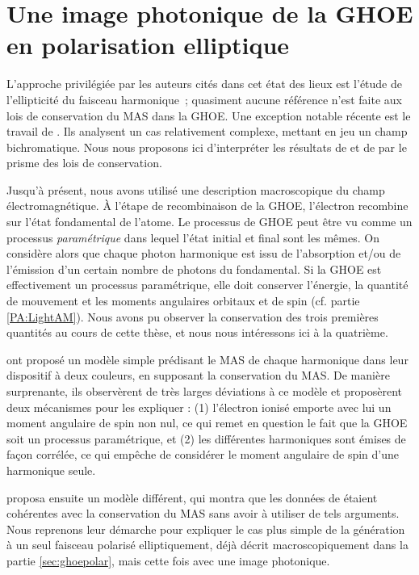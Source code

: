 \section{Une image photonique de la GHOE en polarisation elliptique}
L'approche privilégiée par les auteurs cités dans cet état des lieux est l'étude de l'ellipticité du faisceau harmonique~; quasiment aucune référence n'est faite aux lois de conservation du MAS dans la GHOE. Une exception notable récente est le travail de . Ils analysent un cas relativement complexe, mettant en jeu un champ bichromatique. Nous nous proposons ici d'interpréter les résultats de  et de  par le prisme des lois de conservation.

Jusqu'à présent, nous avons utilisé une description macroscopique du champ électromagnétique. \`A l'étape de recombinaison de la GHOE, l'électron recombine sur l'état fondamental de l'atome. Le processus de GHOE peut être vu comme un processus \textit{paramétrique} dans lequel l'état initial et final sont les mêmes. On considère alors que chaque photon harmonique est issu de l'absorption et/ou de l'émission d'un certain nombre de photons du fondamental. Si la GHOE est effectivement un processus paramétrique, elle doit conserver l'énergie, la quantité de mouvement et les moments angulaires orbitaux et de spin (cf. partie \ref{PA:LightAM}). Nous avons pu observer la conservation des trois premières quantités au cours de cette thèse, et nous nous intéressons ici à la quatrième.

 ont proposé un modèle simple prédisant le MAS de chaque harmonique dans leur dispositif à deux couleurs, en supposant la conservation du MAS. De manière surprenante, ils observèrent de très larges déviations à ce modèle et proposèrent deux mécanismes pour les expliquer : (1) l'électron ionisé emporte avec lui un moment angulaire de spin non nul, ce qui remet en question le fait que la GHOE soit un processus paramétrique, et (2) les différentes harmoniques sont émises de façon corrélée, ce qui empêche de considérer le moment angulaire de spin d'une harmonique seule.\par
{} proposa ensuite un modèle différent, qui montra que les données de  étaient cohérentes avec la conservation du MAS sans avoir à utiliser de tels arguments. Nous reprenons leur démarche pour expliquer le cas plus simple de la génération à un seul faisceau polarisé elliptiquement, déjà décrit macroscopiquement dans la partie \ref{sec:ghoepolar}, mais cette fois avec une image photonique.

